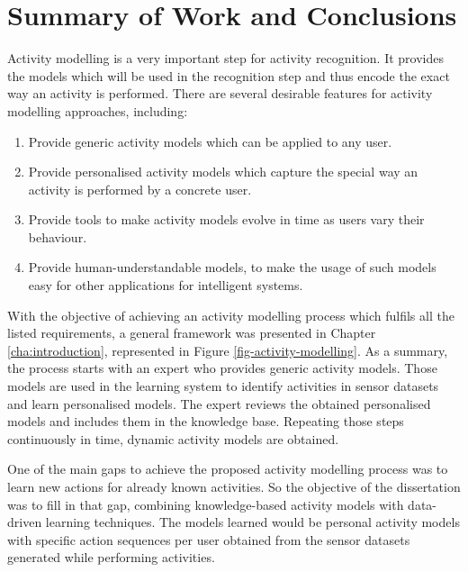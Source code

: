 \section{Summary of Work and Conclusions}
\label{sec:conclusions:conclusions}

Activity modelling is a very important step for activity recognition. It provides the models which will be used in the recognition step and thus encode the exact way an activity is performed. There are several desirable features for activity modelling approaches, including:

\begin{enumerate}
 \item Provide generic activity models which can be applied to any user.
 \item Provide personalised activity models which capture the special way an activity is performed by a concrete user.
 \item Provide tools to make activity models evolve in time as users vary their behaviour.
 \item Provide human-understandable models, to make the usage of such models easy for other applications for intelligent systems.
\end{enumerate}

With the objective of achieving an activity modelling process which fulfils all the listed requirements, a general framework was presented in Chapter \ref{cha:introduction}, represented in Figure \ref{fig-activity-modelling}. As a summary, the process starts with an expert who provides generic activity models. Those models are used in the learning system to identify activities in sensor datasets and learn personalised models. The expert reviews the obtained personalised models and includes them in the knowledge base. Repeating those steps continuously in time, dynamic activity models are obtained.

One of the main gaps to achieve the proposed activity modelling process was to learn new actions for already known activities. So the objective of the dissertation was to fill in that gap, combining knowledge-based activity models with data-driven learning techniques. The models learned would be personal activity models with specific action sequences per user obtained from the sensor datasets generated while performing activities.

